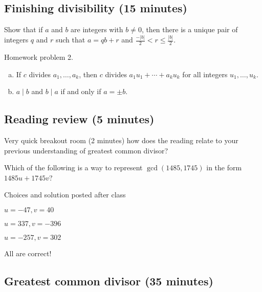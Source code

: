 \documentclass[letterpaper, 11 pt]{article}
\begin{document}
\subsection{Finishing divisibility (15 minutes)} 
\begin{br}
 Show that if $a$ and $b$ are integers with $b\neq 0$, then there is a unique pair of integers $q$ and $r$ such that $a=qb+r$ and $\frac{-|b|}{2}<r\leq \frac{|b|}{2}$.
\end{br}
\begin{solution}
 Homework problem 2.
\end{solution}
\begin{thm}[Theorem 1.3]
 
\begin{enumerate}[(a)]
 \item If $c$ divides $a_1,\dots, a_k$, then $c$ divides $a_1u_1+\cdots+a_ku_k$ for all integers $u_1,\dots,u_k$.
 \item $a\mid b$ and $b\mid a$ if and only if $a=\pm b$.
\end{enumerate}
\end{thm}


\subsection{Reading review (5 minutes)} 

Very quick breakout room (2 minutes) how does the reading relate to your previous understanding of greatest common divisor?

\begin{poll}
 Which of the following is a way to represent $\gcd(1485, 1745)$ in the form $1485u+1745v$?
\end{poll}
\begin{solution}
 Choices and solution posted after class
 
 $u=-47,v=40$
 
 $u=337, v=-396$
 
 $u=-257, v=302$
 
All are correct!
\end{solution}

\subsection{Greatest common divisor (35 minutes)} 
\end{document}
